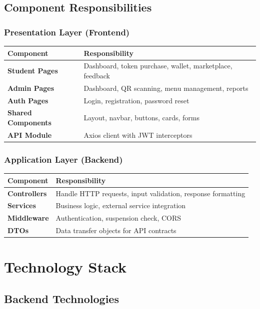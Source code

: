 \documentclass[11pt,a4paper]{report}
\begin{document}
\section{Component Responsibilities}

\subsection{Presentation Layer (Frontend)}
\begin{longtable}{@{}ll@{}}
\toprule
\textbf{Component} & \textbf{Responsibility} \\ \midrule
\textbf{Student Pages} & Dashboard, token purchase, wallet, marketplace, feedback \\
\textbf{Admin Pages} & Dashboard, QR scanning, menu management, reports \\
\textbf{Auth Pages} & Login, registration, password reset \\
\textbf{Shared Components} & Layout, navbar, buttons, cards, forms \\
\textbf{API Module} & Axios client with JWT interceptors \\ \bottomrule
\end{longtable}

\subsection{Application Layer (Backend)}
\begin{longtable}{@{}ll@{}}
\toprule
\textbf{Component} & \textbf{Responsibility} \\ \midrule
\textbf{Controllers} & Handle HTTP requests, input validation, response formatting \\
\textbf{Services} & Business logic, external service integration \\
\textbf{Middleware} & Authentication, suspension check, CORS \\
\textbf{DTOs} & Data transfer objects for API contracts \\ \bottomrule
\end{longtable}

\chapter{Technology Stack}

\section{Backend Technologies}
\end{document}
